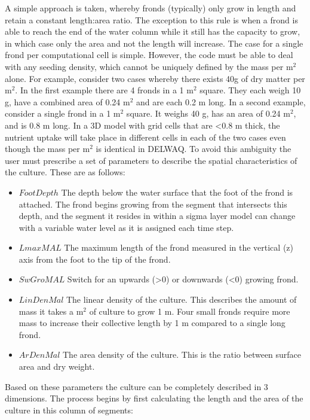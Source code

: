 \documentclass{deltares_manual}
\begin{document}
A simple approach is taken, whereby fronds (typically) only grow in length and retain a constant length:area ratio. The exception to this rule is when a frond is able to reach the end of the water column while it still has the capacity to grow, in which case only the area and not the length will increase. The case for a single frond per computational cell is simple. However, the code must be able to deal with any seeding density, which cannot be uniquely defined by the mass per m$^{2}$ alone. For example, consider two cases whereby there exists 40g of dry matter per m$^{2}$. In the first example there are 4 fronds in a 1 m$^{2}$ square. They each weigh 10 g, have a combined area of 0.24 m$^{2}$ and are each 0.2 m long. In a second example, consider a single frond in a 1 m$^{2}$ square. It weighs 40 g, has an area of 0.24 m$^{2}$, and is 0.8 m long. In a 3D model with grid cells that are \textless 0.8 m thick, the nutrient uptake will take place in different cells in each of the two cases even though the mass per m$^{2}$ is identical in DELWAQ. To avoid this ambiguity the user must prescribe a set of parameters to describe the spatial characteristics of the culture. These are as follows:

\begin{itemize}
\item $FootDepth$ The depth below the water surface that the foot of the frond is attached. The frond begins growing from the segment that intersects this depth, and the segment it resides in within a sigma layer model can change with a variable water level as it is assigned each time step.
\item $LmaxMAL$ The maximum length of the frond measured in the vertical (z) axis from the foot to the tip of the frond.
\item $SwGroMAL$ Switch for an upwards (\textgreater 0) or downwards (\textless 0) growing frond.
\item $LinDenMal$ The linear density of the culture. This describes the amount of mass it takes a m$^{2}$ of culture to grow 1 m. Four small fronds require more mass to increase their collective length by 1 m compared to a single long frond.
\item $ArDenMal$ The area density of the culture. This is the ratio between surface area and dry weight.
\end{itemize}

Based on these parameters the culture can be completely described in 3 dimensions. The process begins by first calculating the length and the area of the culture in this column of segments:
\end{document}
